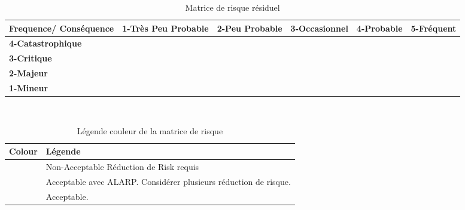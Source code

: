 \documentclass[12pt]{article}
\begin{document}
 

\begin{table}[H]
\centering
\scriptsize
\caption{Matrice de risque résiduel}
\begin{tabular}{|p{2cm}|p{2cm}|p{2cm}| p{2cm} |p{2cm}| p{2cm}|}
\hline \bf Frequence/ Conséquence & \bf 1-Très Peu Probable & \bf 2-Peu Probable & \bf 3-Occasionnel & \bf 4-Probable & \bf 5-Fréquent\\ [10pt]
\hline \bf 4-Catastrophique & \cellcolor{yellow!50} & \cellcolor{red!50} & \cellcolor{red!50} & \cellcolor{red!50} &\cellcolor{red!50} \\ [10pt]
\hline \bf 3-Critique &\cellcolor{green!50} & \cellcolor{yellow!50} & \cellcolor{yellow!50} & \cellcolor{red!50} &\cellcolor{red!50} \\ [10pt]
\hline \bf 2-Majeur & \cellcolor{green!50} & \cellcolor{green!50} & \cellcolor{yellow!50} &\cellcolor{yellow!50} &\cellcolor{red!50} \\ [10pt]
\hline \bf 1-Mineur & \cellcolor{green!50} & \cellcolor{green!50} & \cellcolor{green!50} &\cellcolor{yellow!50} &\cellcolor{yellow!50} \\ [10pt]
\hline
\end{tabular} \\
\end{table}

 

\begin{table}[H]
\centering
\caption{Légende couleur de la matrice de risque}
\begin{tabular}{|p{2cm}|p{10cm}|}
\hline \bf Colour & \bf Légende \\
\hline \cellcolor{red! 50} & Non-Acceptable Réduction de Risk requis \\ [10pt]
\hline \cellcolor{yellow! 50} & Acceptable avec ALARP. Considérer plusieurs réduction de risque. \\[10pt]
\hline \cellcolor{green! 50} & Acceptable. \\ [10pt]
\hline
\end{tabular}
\end{table}
\end{document}
